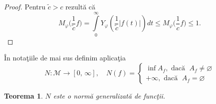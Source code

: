 \documentclass[ a4paper, 12pt]{report}
\newtheorem{theorem}{\bf Teorema}[section]
\theoremstyle{definition}
\theoremstyle{remark}
\numberwithin{equation}{section}
\begin{document}
\begin{proof}
Pentru $\tilde{c} > c$ rezult\u a c\u a
 $$M_\varphi \big(\frac{1}{\tilde{c}}f\big) = \int\limits_{0}^{\infty}Y_\varphi (\frac{1}{\tilde{c}} \lvert f(t) \rvert) dt \leq M_\varphi \big(\frac{1}{c} f\big)\leq 1.$$
\end{proof}

\medskip

\^ In nota\c tiile de mai sus definim aplica\c tia
$$N : \mathcal{M} \rightarrow [0,\, \infty], \quad N(f) = \begin{cases}
\inf A_f, \text{ dac\u a } \; A_f \neq \varnothing\\
+\infty, \text{ dac\u a } \; A_f = \varnothing
\end{cases}$$

\begin{theorem}
$N$ este o norm\u a generalizat\u a de func\c tii.
\end{theorem}
\end{document}
